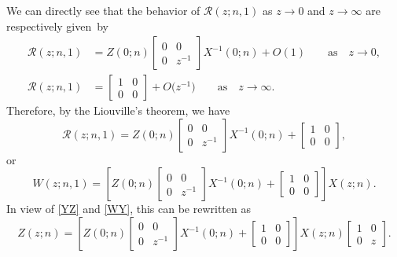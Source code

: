 \documentclass[10pt,a4paper]{amsart}
\numberwithin{equation}{section}
\newcommand{\qasq}{\qquad \text{as} \quad}
\begin{document}
	
	We can directly see that the behavior of $\mathscr{R}(z;n,1)$ as $z \to 0$ and $z \to \infty$ are respectively given~by
	\begin{align*}
		\mathscr{R}(z;n,1) & = Z(0;n) \begin{bmatrix}
			0 & 0 \\
			0 & z^{-1}
		\end{bmatrix} X^{-1}(0;n) + O(1) \qasq z \to 0, \\
		\mathscr{R}(z;n,1) & = \begin{bmatrix}
			1 & 0 \\
			0 & 0
		\end{bmatrix} + O\big(z^{-1}\big) \qasq z \to \infty.
	\end{align*}
	Therefore, by the Liouville's theorem, we have
	\begin{equation*}
		\mathscr{R}(z;n,1) = Z(0;n) \begin{bmatrix}
			0 & 0 \\
			0 & z^{-1}
		\end{bmatrix} X^{-1}(0;n) + \begin{bmatrix}
			1 & 0 \\
			0 & 0
		\end{bmatrix},
	\end{equation*}
	or
	\begin{equation*}
		W(z;n,1) = \left[ Z(0;n) \begin{bmatrix}
			0 & 0 \\
			0 & z^{-1}
		\end{bmatrix} X^{-1}(0;n) + \begin{bmatrix}
			1 & 0 \\
			0 & 0
		\end{bmatrix} \right] X(z;n).
	\end{equation*}
	In view of \eqref{YZ} and \eqref{WY}, this can be rewritten as
	\begin{equation}\label{ZX}
		Z(z;n) = \left[ Z(0;n) \begin{bmatrix}
			0 & 0 \\
			0 & z^{-1}
		\end{bmatrix} X^{-1}(0;n) + \begin{bmatrix}
			1 & 0 \\
			0 & 0
		\end{bmatrix} \right] X(z;n) \begin{bmatrix}
			1 & 0 \\
			0 & z
		\end{bmatrix}.
	\end{equation}
\end{document}
